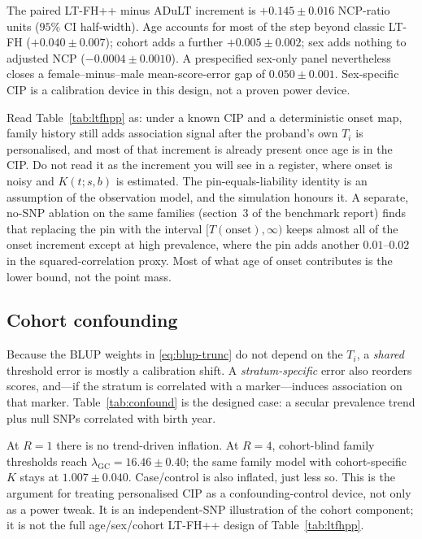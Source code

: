 \documentclass[11pt,a4paper]{article}
\begin{document}
The paired LT-FH++ minus ADuLT increment is
$+0.145\pm 0.016$ NCP-ratio units ($95\%$ CI half-width).
Age accounts for most of the step beyond classic LT-FH
($+0.040\pm 0.007$); cohort adds a further
$+0.005\pm 0.002$; sex adds nothing to adjusted NCP
($-0.0004\pm 0.0010$).
A prespecified sex-only panel nevertheless closes a
female--minus--male mean-score-error gap of
$0.050\pm 0.001$.
Sex-specific CIP is a calibration device in this design, not a
proven power device.

Read Table~\ref{tab:ltfhpp} as: under a known CIP and a
deterministic onset map, family history still adds association
signal after the proband's own $T_i$ is personalised, and most of
that increment is already present once age is in the CIP.
Do not read it as the increment you will see in a register, where
onset is noisy and $K(t;s,b)$ is estimated.
The pin-equals-liability identity is an assumption of the
observation model, and the simulation honours it.
A separate, no-SNP ablation on the same families (section~3 of
the benchmark report) finds that replacing the pin with the
interval $[T(\mathrm{onset}),\infty)$ keeps almost all of the
onset increment except at high prevalence, where the pin adds
another $0.01$--$0.02$ in the squared-correlation proxy.
Most of what age of onset contributes is the lower bound, not the
point mass.

\subsection{Cohort confounding}
\label{sec:confound}

Because the BLUP weights in \eqref{eq:blup-trunc} do not depend on
the $T_i$, a \emph{shared} threshold error is mostly a calibration
shift.
A \emph{stratum-specific} error also reorders scores, and---if the
stratum is correlated with a marker---induces association on that
marker.
Table~\ref{tab:confound} is the designed case: a secular prevalence
trend plus null SNPs correlated with birth year.

\begin{table}[ht]
\centering
\caption{Stratified-null $\lambda_{\mathrm{GC}}$ under a lifetime
prevalence trend of $R$ per $30$ birth years.
Three replicates.
Truly independent null SNPs stay near $1$ for every method.}
\label{tab:confound}
\small

\end{table}

At $R=1$ there is no trend-driven inflation.
At $R=4$, cohort-blind family thresholds reach
$\lambda_{\mathrm{GC}}=16.46\pm 0.40$; the same family model with
cohort-specific $K$ stays at $1.007\pm 0.040$.
Case/control is also inflated, just less so.
This is the argument for treating personalised CIP as a
confounding-control device, not only as a power tweak.
It is an independent-SNP illustration of the cohort component; it
is not the full age/sex/cohort LT-FH++ design of
Table~\ref{tab:ltfhpp}.
\end{document}
